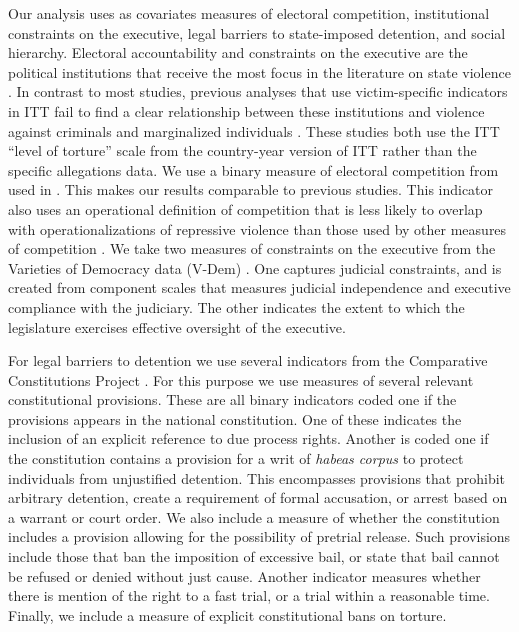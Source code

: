 \documentclass[11pt]{article}
\begin{document}
Our analysis uses as covariates measures of electoral competition, institutional constraints on the executive, legal barriers to state-imposed detention, and social hierarchy. Electoral accountability and constraints on the executive are the political institutions that receive the most focus in the literature on state violence \citep[E.g.,][]{Davenport2007}. In contrast to most studies, previous analyses that use victim-specific indicators in ITT fail to find a clear relationship between these institutions and violence against criminals and marginalized individuals \citep{Haschke2018,JacksonHillHall2018}. These studies both use the ITT ``level of torture'' scale from the country-year version of ITT \citep{conrad2013disaggregating} rather than the specific allegations data. We use a binary measure of electoral competition from \citet{cheibub2010democracy} used in \citet{Haschke2018,JacksonHillHall2018}. This makes our results comparable to previous studies. This indicator also uses an operational definition of competition that is less likely to overlap with operationalizations of repressive violence than those used by other measures of competition \citep[See][]{Hill2016}. We take two measures of constraints on the executive from the Varieties of Democracy data (V-Dem) \citep{Vdem}. One captures judicial constraints, and is created from component scales that measures judicial independence and executive compliance with the judiciary. The other indicates the extent to which the legislature exercises effective oversight of the executive. 

For legal barriers to detention we use several indicators from the Comparative Constitutions Project \citep{CCP2014}. For this purpose we use measures of several relevant constitutional provisions. These are all binary indicators coded one if the provisions appears in the national constitution. One of these indicates the inclusion of an explicit reference to due process rights. Another is coded one if the constitution contains a provision for a writ of {\em habeas corpus} to protect individuals from unjustified detention. This encompasses provisions that prohibit arbitrary detention, create a requirement of formal accusation, or arrest based on a warrant or court order. We also include a measure of whether the constitution includes a provision allowing for the possibility of pretrial release. Such provisions include those that ban the imposition of excessive bail, or state that bail cannot be refused or denied without just cause. Another indicator measures whether there is mention of the right to a fast trial, or a trial within a reasonable time. Finally, we include a measure of explicit constitutional bans on torture. 
\end{document}
